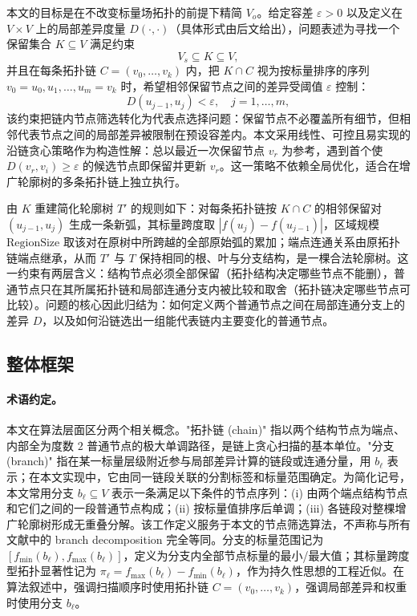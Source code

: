 \documentclass[twocolumn, a4paper, 10pt]{article}
\begin{document}
本文的目标是在不改变标量场拓扑的前提下精简 $V_o$。给定容差 $\varepsilon>0$ 以及定义在 $V\times V$ 上的局部差异度量 $D(\cdot,\cdot)$（具体形式由后文给出），问题表述为寻找一个保留集合 $K\subseteq V$ 满足约束
\begin{equation}
V_s\subseteq K\subseteq V,
\label{eq:keep-constraint}
\end{equation}
并且在每条拓扑链 $C=(v_0,\ldots,v_k)$ 内，把 $K\cap C$ 视为按标量排序的序列 $v_0=u_0,u_1,\ldots,u_m=v_k$ 时，希望相邻保留节点之间的差异受阈值 $\varepsilon$ 控制：
\begin{equation}
D(u_{j-1},u_j)<\varepsilon,\quad j=1,\ldots,m,
\label{eq:eps-cover}
\end{equation}
该约束把链内节点筛选转化为代表点选择问题：保留节点不必覆盖所有细节，但相邻代表节点之间的局部差异被限制在预设容差内。本文采用线性、可控且易实现的沿链贪心策略作为构造性解：总以最近一次保留节点 $v_r$ 为参考，遇到首个使 $D(v_r,v_i)\geq\varepsilon$ 的候选节点即保留并更新 $v_r$。这一策略不依赖全局优化，适合在增广轮廓树的多条拓扑链上独立执行。

由 $K$ 重建简化轮廓树 $T'$ 的规则如下：对每条拓扑链按 $K\cap C$ 的相邻保留对 $(u_{j-1},u_j)$ 生成一条新弧，其标量跨度取 $|f(u_j)-f(u_{j-1})|$，区域规模 $\text{RegionSize}$ 取该对在原树中所跨越的全部原始弧的累加；端点连通关系由原拓扑链端点继承，从而 $T'$ 与 $T$ 保持相同的根、叶与分支结构，是一棵合法轮廓树。这一约束有两层含义：结构节点必须全部保留（拓扑结构决定哪些节点不能删），普通节点只在其所属拓扑链和局部连通分支内被比较和取舍（拓扑链决定哪些节点可比较）。问题的核心因此归结为：如何定义两个普通节点之间在局部连通分支上的差异 $D$，以及如何沿链选出一组能代表链内主要变化的普通节点。

\subsection{整体框架}

\paragraph{术语约定。}本文在算法层面区分两个相关概念。"拓扑链 (chain)" 指以两个结构节点为端点、内部全为度数 $2$ 普通节点的极大单调路径，是链上贪心扫描的基本单位。"分支 (branch)" 指在某一标量层级附近参与局部差异计算的链段或连通分量，用 $b_\ell$ 表示；在本文实现中，它由同一链段关联的分割标签和标量范围确定。为简化记号，本文常用分支 $b_\ell\subseteq V$ 表示一条满足以下条件的节点序列：(i) 由两个端点结构节点和它们之间的一段普通节点构成；(ii) 按标量值排序后单调；(iii) 各链段对整棵增广轮廓树形成无重叠分解。该工作定义服务于本文的节点筛选算法，不声称与所有文献中的 branch decomposition 完全等同。分支的标量范围记为 $[f_{\min}(b_\ell),f_{\max}(b_\ell)]$，定义为分支内全部节点标量的最小/最大值；其标量跨度型拓扑显著性记为 $\pi_\ell=f_{\max}(b_\ell)-f_{\min}(b_\ell)$，作为持久性思想的工程近似。在算法叙述中，强调扫描顺序时使用拓扑链 $C=(v_0,\ldots,v_k)$，强调局部差异和权重时使用分支 $b_\ell$。
\end{document}
